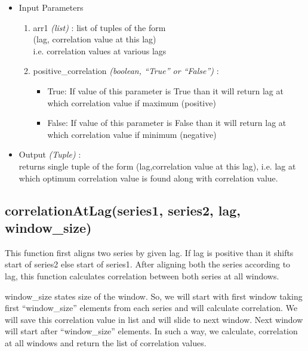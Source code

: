 \begin{itemize}
 \item Input Parameters
 
 \begin{enumerate}
  \item arr1 \textit{(list)} : list of tuples of the form \\ (lag, correlation 
value at this lag) \\ i.e. correlation values at various lags
  \item positive\_correlation \textit{(boolean, ``True'' or ``False'')} : 
      \begin{itemize}
       \item True: If value of this parameter is True than it will return lag 
at which correlation value if maximum (positive)
       \item False: If value of this parameter is False than it will return lag 
at which correlation value if minimum (negative)
      \end{itemize}

 \end{enumerate}

 \item Output \textit{(Tuple)} : \\
  returns single tuple of the form (lag,correlation value at this lag), i.e. 
lag at which optimum correlation value is found along with correlation value.
 
\end{itemize}


\subsection{correlationAtLag(series1, series2, lag, window\_size)}

This function first aligns two series by given lag. If lag is positive than it 
shifts start of series2 else start of series1. After aligning both the series 
according to lag, this function calculates correlation between both series at 
all windows. 

window\_size states size of the window. So, we will start with first window 
taking first ``window\_size'' elements from each series and will calculate 
correlation. We will save this correlation value in list and will slide to next 
window. Next window will start after ``window\_size'' elements. In such a way, we 
calculate, correlation at all windows and return the list of correlation values.


